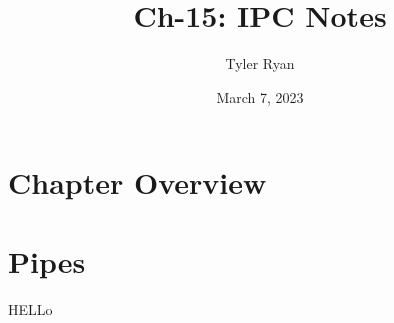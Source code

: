 \documentclass{article}
\author{Tyler Ryan}
\title{Ch-15: IPC Notes}
\date{March 7, 2023}
\begin{document}
\maketitle
\tableofcontents
\clearpage
\section{Chapter Overview}
\section{Pipes}
HELLo
\end{document}
